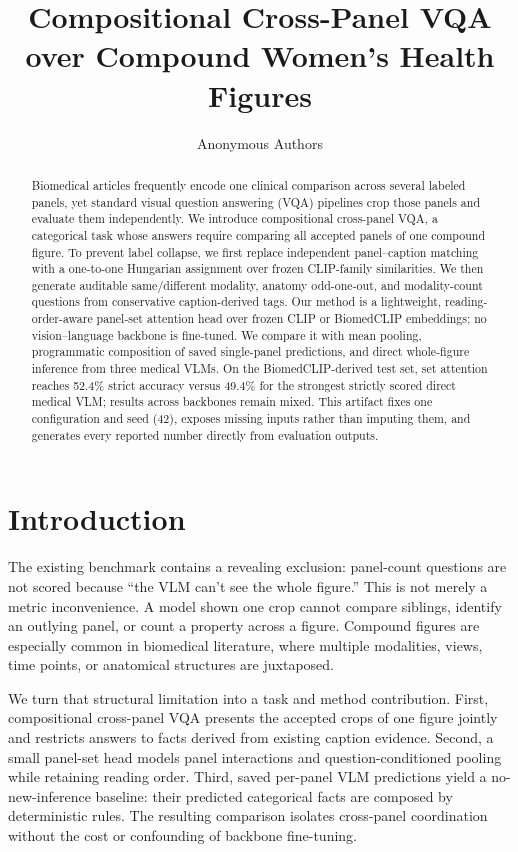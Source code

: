 \documentclass{article}
\title{Compositional Cross-Panel VQA over Compound Women's Health Figures}
\author{Anonymous Authors}
\begin{document}
\maketitle

\begin{abstract}
Biomedical articles frequently encode one clinical comparison across several labeled panels, yet standard visual question answering (VQA) pipelines crop those panels and evaluate them independently. We introduce compositional cross-panel VQA, a categorical task whose answers require comparing all accepted panels of one compound figure. To prevent label collapse, we first replace independent panel--caption matching with a one-to-one Hungarian assignment over frozen CLIP-family similarities. We then generate auditable same/different modality, anatomy odd-one-out, and modality-count questions from conservative caption-derived tags. Our method is a lightweight, reading-order-aware panel-set attention head over frozen CLIP or BiomedCLIP embeddings; no vision--language backbone is fine-tuned. We compare it with mean pooling, programmatic composition of saved single-panel predictions, and direct whole-figure inference from three medical VLMs. On the BiomedCLIP-derived test set, set attention reaches 52.4\% strict accuracy versus 49.4\% for the strongest strictly scored direct medical VLM; results across backbones remain mixed. This artifact fixes one configuration and seed (42), exposes missing inputs rather than imputing them, and generates every reported number directly from evaluation outputs.
\end{abstract}

\section{Introduction}
The existing benchmark contains a revealing exclusion: panel-count questions are not scored because ``the VLM can't see the whole figure.'' This is not merely a metric inconvenience. A model shown one crop cannot compare siblings, identify an outlying panel, or count a property across a figure. Compound figures are especially common in biomedical literature, where multiple modalities, views, time points, or anatomical structures are juxtaposed.

We turn that structural limitation into a task and method contribution. First, compositional cross-panel VQA presents the accepted crops of one figure jointly and restricts answers to facts derived from existing caption evidence. Second, a small panel-set head models panel interactions and question-conditioned pooling while retaining reading order. Third, saved per-panel VLM predictions yield a no-new-inference baseline: their predicted categorical facts are composed by deterministic rules. The resulting comparison isolates cross-panel coordination without the cost or confounding of backbone fine-tuning.
\end{document}
